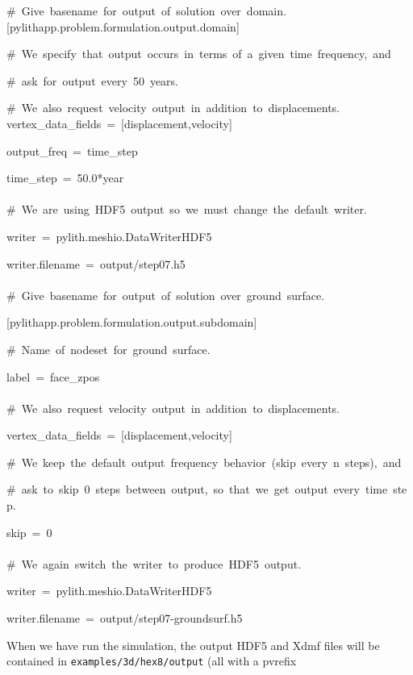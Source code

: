 \begin{lyxcode}
\#~Give~basename~for~output~of~solution~over~domain.~\\
{[}pylithapp.problem.formulation.output.domain{]}

\#~We~specify~that~output~occurs~in~terms~of~a~given~time~frequency,~and

\#~ask~for~output~every~50~years.

\#~We~also~request~velocity~output~in~addition~to~displacements.~\\
vertex\_data\_fields~=~{[}displacement,velocity{]}

output\_freq~=~time\_step

time\_step~=~50.0{*}year~\\
~\\


\#~We~are~using~HDF5~output~so~we~must~change~the~default~writer.

writer~=~pylith.meshio.DataWriterHDF5

writer.filename~=~output/step07.h5~\\
~\\


\#~Give~basename~for~output~of~solution~over~ground~surface.

{[}pylithapp.problem.formulation.output.subdomain{]}

\#~Name~of~nodeset~for~ground~surface.

label~=~face\_zpos~\\
~\\


\#~We~also~request~velocity~output~in~addition~to~displacements.

vertex\_data\_fields~=~{[}displacement,velocity{]}

\#~We~keep~the~default~output~frequency~behavior~(skip~every~n~steps),~and

\#~ask~to~skip~0~steps~between~output,~so~that~we~get~output~every~time~step.

skip~=~0~\\
~\\


\#~We~again~switch~the~writer~to~produce~HDF5~output.

writer~=~pylith.meshio.DataWriterHDF5

writer.filename~=~output/step07-groundsurf.h5
\end{lyxcode}
When we have run the simulation, the output HDF5 and Xdmf files will
be contained in \texttt{examples/3d/hex8/output} (all with a pvrefix
